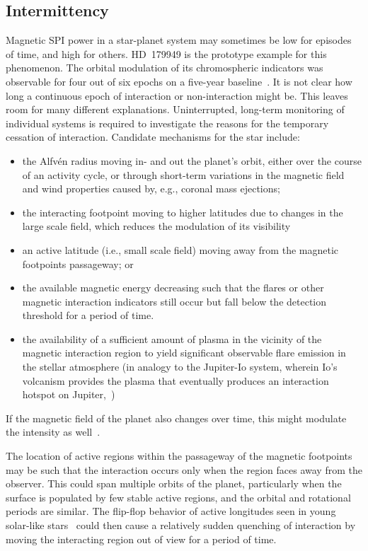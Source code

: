 \documentclass[twocolumn]{aastex631}
\begin{document}
\subsection{Intermittency}
\label{sec:discussion:intermittency}
Magnetic SPI power in a star-planet system may sometimes be low for episodes of time, and high for others. HD~179949 is the prototype example for this phenomenon. The orbital modulation of its chromospheric indicators was observable for four out of six epochs on a five-year baseline~\citep{shkolnik2003evidence,shkolnik2008nature}. It is not clear how long a continuous epoch of interaction or non-interaction might be. This leaves room for many different explanations. Uninterrupted, long-term monitoring of individual systems is required to investigate the reasons for the temporary cessation of interaction. Candidate mechanisms for the star include: 
\begin{itemize}
    \item the Alfv\'en radius moving in- and out the planet's orbit, either over the course of an activity cycle, or through short-term variations in the magnetic field and wind properties caused by, e.g., coronal mass ejections;
    \item the interacting footpoint moving to higher latitudes due to changes in the large scale field, which reduces the modulation of its visibility 
    \item an active latitude (i.e., small scale field) moving away from the magnetic footpoints passageway; or
    \item the available magnetic energy decreasing such that the flares or other magnetic interaction indicators still occur but fall below the detection threshold for a period of time.
    \item the availability of a sufficient amount of plasma in the vicinity of the magnetic interaction region to yield significant observable flare emission in the stellar atmosphere (in analogy to the Jupiter-Io system, wherein Io's volcanism provides the plasma that eventually produces an interaction hotspot on Jupiter,~\citealt{clarke1996farultraviolet, prange1996rapid})
\end{itemize}

If the magnetic field of the planet also changes over time, this might modulate the intensity as well~\citep[e.g.][]{turnpenney2018exoplanetinduced}.

The location of active regions within the passageway of the magnetic footpoints may be such that the interaction occurs only when the region faces away from the observer. This could span multiple orbits of the planet, particularly when the surface is populated by few stable active regions, and the orbital and rotational periods are similar. The flip-flop behavior of active longitudes seen in young solar-like stars~\citep{berdyugina2005starspots} could then cause a relatively sudden quenching of interaction by moving the interacting region out of view for a period of time. 
\end{document}
